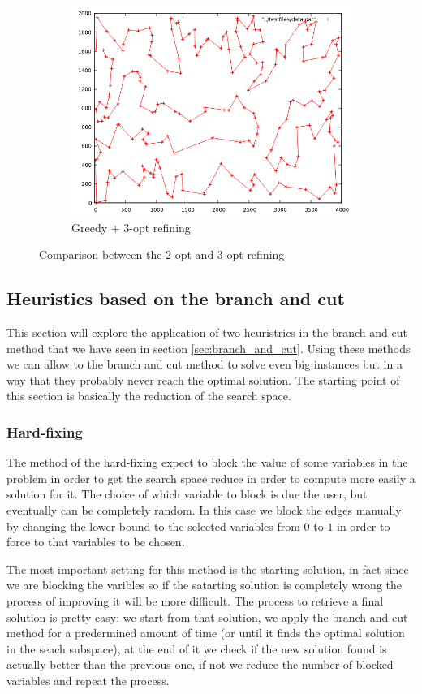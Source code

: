 \begin{figure}
\begin{subfigure}[b]{0.5\textwidth}
		\includegraphics[width=\textwidth]{images/3_opt}
		\caption{Greedy + 3-opt refining}
	\end{subfigure}
	\caption{Comparison between the 2-opt and 3-opt refining}
	\label{img:k_opt}
\end{figure}

\subsection{Heuristics based on the branch and cut}
This section will explore the application of two heuristrics in the branch and cut method that we have seen in section \ref{sec:branch_and_cut}. Using these methods we can allow to the branch and cut method to solve even big instances but in a way that they probably never reach the optimal solution. The starting point of this section is basically the reduction of the search space.


\subsubsection{Hard-fixing}
\label{sec:hard_fix}
The method of the hard-fixing expect to block the value of some variables in the problem in order to get the search space reduce in order to compute more easily a solution for it. The choice of which variable to block is due the user, but eventually can be completely random. In this case we block the edges manually by changing the lower bound to the selected variables from $0$ to $1$ in order to force to that variables to be chosen.

The most important setting for this method is the starting solution, in fact since we are blocking the varibles so if the satarting solution is completely wrong the process of improving it will be more difficult. The process to retrieve a final solution is pretty easy: we start from that solution, we apply the branch and cut method for a predermined amount of time (or until it finds the optimal solution in the seach subspace), at the end of it we check if the new solution found is actually better than the previous one, if not we reduce the number of blocked variables and repeat the process. 

